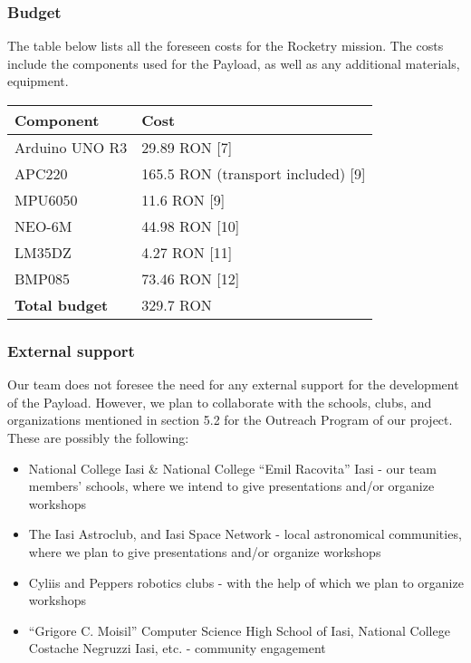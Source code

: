 \subsubsection{Budget}

The table below lists all the foreseen costs for the Rocketry mission. The costs include the components used for the Payload, as well as any additional materials, equipment.

\begin{table}[H]
\centering
\begin{tabularx}{\textwidth}{|X|X|}
\hline
\textbf{Component} & \textbf{Cost} \\ \hline
Arduino UNO R3 & 29.89 RON [7] \\
APC220 & 165.5 RON (transport included) [9] \\
MPU6050 & 11.6 RON [9] \\
NEO-6M & 44.98 RON [10] \\ 
LM35DZ & 4.27 RON [11] \\
BMP085 & 73.46 RON [12] \\ \hline
\textbf{Total budget} & 329.7 RON \\ \hline
\end{tabularx}
\end{table}

\subsubsection{External support}

Our team does not foresee the need for any external support for the development of the Payload. However, we plan to collaborate with the schools, clubs, and organizations mentioned in section 5.2 for the Outreach Program of our project. These are possibly the following:

\begin{itemize}

\item National College Iasi \& National College “Emil Racovita” Iasi - our team members' schools, where we intend to give presentations and/or organize workshops
\item The Iasi Astroclub, and Iasi Space Network - local astronomical communities, where we plan to give presentations and/or organize workshops
\item Cyliis and Peppers robotics clubs - with the help of which we plan to organize workshops
\item “Grigore C. Moisil” Computer Science High School of Iasi, National College Costache Negruzzi Iasi, etc. - community engagement

\end{itemize}

